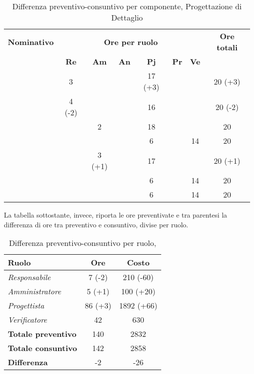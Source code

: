 \begin{table}[H]
	\begin{center}
		\begin{tabular}{|c|c|c|c|c|c|c|c|}
			\hline
			\textbf{Nominativo} & \multicolumn{6}{c|}{\textbf{Ore per ruolo}} & \textbf{Ore totali} \\
			& \textbf{Re} & \textbf{Am} & \textbf{An} & \textbf{Pj} & \textbf{Pr} & \textbf{Ve} & \\
			\hline
			\FB			&	3		&			&		&	17 (+3)	&		&		&	20 (+3)		\\
			\hline
			\AF			&	4 (-2)	&			&		&	16 		&		&		& 	20 (-2)		\\
			\hline
			\GN			&			&	2		&		&	18		&		&		&	20			\\
			\hline
			\GR			&			&	 		&		&	6		&	 	& 	14	&	20			\\
			\hline
			\SM 		&			&	3 (+1)	&		&	17		&		& 		&	20 (+1)		\\
			\hline
			\MP 		& 			&			&		&	6		&		&	14	&	20			\\
			\hline
			\MV 		&			&			&		&	6		&		&	14	& 	20			\\
			\hline
		\end{tabular}
	\end{center}
	\caption{Differenza preventivo-consuntivo per componente, Progettazione di Dettaglio}
\end{table}


La tabella sottostante, invece, riporta le ore preventivate e  tra parentesi la differenza di ore tra preventivo e consuntivo, divise per ruolo.

\begin{table}[H]
	\begin{center}
		\begin{tabular}{|l|c|c|}
			\hline
			\textbf{Ruolo}	& \textbf{Ore} & \textbf{Costo} \\
			\hline
			\textit{Responsabile}		&	7 (-2)	&	210 (-60) 		\\
			\hline
			\textit{Amministratore}		&	5 (+1)	&	100	(+20)		\\
			\hline
			\textit{Progettista}		&	86 (+3)	&	1892 (+66) 		\\
			\hline
			\textit{Verificatore}		&	42 		&	630 			\\
			\hline
			\textbf{Totale preventivo}	&	140		& 	2832			\\
			\hline
			\textbf{Totale consuntivo}	&	142		&  	2858			\\
			\hline
			\textbf{Differenza} 		&	-2		&	-26				\\
			\hline
		\end{tabular}
	\end{center}
	\caption{Differenza preventivo-consuntivo per ruolo, \PD}
\end{table}

